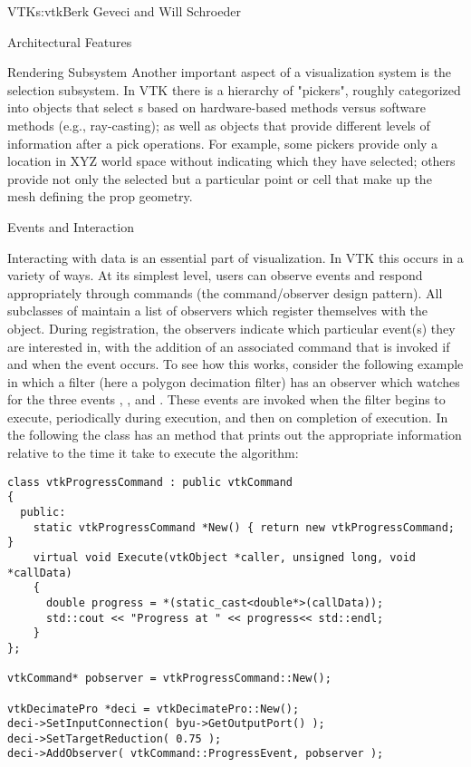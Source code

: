 \begin{aosachapter}{VTK}{s:vtk}{Berk Geveci and Will Schroeder}
\begin{aosasect1}{Architectural Features}
\begin{aosasect2}{Rendering Subsystem}
Another important aspect of a visualization system is the selection
subsystem. In VTK there is a hierarchy of "pickers", roughly
categorized into objects that select s based on
hardware-based methods versus software methods (e.g., ray-casting); as
well as objects that provide different levels of information after a
pick operations. For example, some pickers provide only a location in
XYZ world space without indicating which  they have
selected; others provide not only the selected  but a
particular point or cell that make up the mesh defining the prop
geometry.

\end{aosasect2}

\begin{aosasect2}{Events and Interaction}

Interacting with data is an essential part of visualization. In VTK
this occurs in a variety of ways. At its simplest level, users can
observe events and respond appropriately through commands (the
command/observer design pattern). All subclasses of 
maintain a list of observers which register themselves with the
object. During registration, the observers indicate which particular
event(s) they are interested in, with the addition of an associated
command that is invoked if and when the event occurs. To see how this
works, consider the following example in which a filter (here a
polygon decimation filter) has an observer which watches for the three
events , , and
. These events are invoked when the filter begins to
execute, periodically during execution, and then on completion of
execution. In the following the  class has an
 method that prints out the appropriate information
relative to the time it take to execute the algorithm:

\begin{verbatim}
class vtkProgressCommand : public vtkCommand
{
  public:
    static vtkProgressCommand *New() { return new vtkProgressCommand; }
    virtual void Execute(vtkObject *caller, unsigned long, void *callData)
    {
      double progress = *(static_cast<double*>(callData));
      std::cout << "Progress at " << progress<< std::endl;
    }
};

vtkCommand* pobserver = vtkProgressCommand::New();

vtkDecimatePro *deci = vtkDecimatePro::New();
deci->SetInputConnection( byu->GetOutputPort() );
deci->SetTargetReduction( 0.75 );
deci->AddObserver( vtkCommand::ProgressEvent, pobserver );
\end{verbatim}


\end{aosasect2}
\end{aosasect1}
\end{aosachapter}
